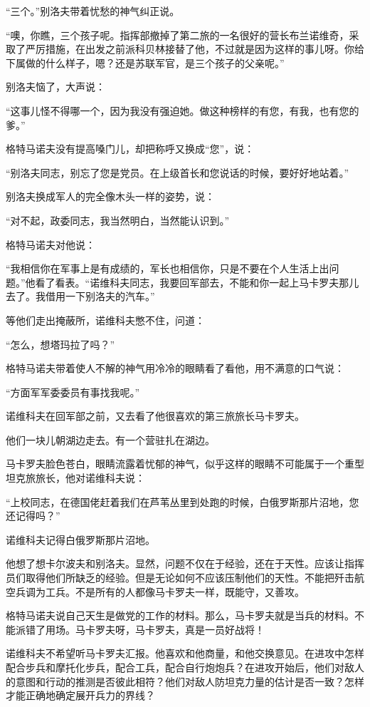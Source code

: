 “三个。”别洛夫带着忧愁的神气纠正说。

“噢，你瞧，三个孩子呢。指挥部撤掉了第二旅的一名很好的营长布兰诺维奇，采取了严厉措施，在出发之前派科贝林接替了他，不过就是因为这样的事儿呀。你给下属做的什么样子，嗯？还是苏联军官，是三个孩子的父亲呢。”

别洛夫恼了，大声说：

“这事儿怪不得哪一个，因为我没有强迫她。做这种榜样的有您，有我，也有您的爹。”

格特马诺夫没有提高嗓门儿，却把称呼又换成“您”，说：

“别洛夫同志，别忘了您是党员。在上级首长和您说话的时候，要好好地站着。”

别洛夫换成军人的完全像木头一样的姿势，说：

“对不起，政委同志，我当然明白，当然能认识到。”

格特马诺夫对他说：

“我相信你在军事上是有成绩的，军长也相信你，只是不要在个人生活上出问题。”他看了看表。“诺维科夫同志，我要回军部去，不能和你一起上马卡罗夫那儿去了。我借用一下别洛夫的汽车。”

等他们走出掩蔽所，诺维科夫憋不住，问道：

“怎么，想塔玛拉了吗？”

格特马诺夫带着使人不解的神气用冷冷的眼睛看了看他，用不满意的口气说：

“方面军军委委员有事找我呢。”

诺维科夫在回军部之前，又去看了他很喜欢的第三旅旅长马卡罗夫。

他们一块儿朝湖边走去。有一个营驻扎在湖边。

马卡罗夫脸色苍白，眼睛流露着忧郁的神气，似乎这样的眼睛不可能属于一个重型坦克旅旅长，他对诺维科夫说：

“上校同志，在德国佬赶着我们在芦苇丛里到处跑的时候，白俄罗斯那片沼地，您还记得吗？”

诺维科夫记得白俄罗斯那片沼地。

他想了想卡尔波夫和别洛夫。显然，问题不仅在于经验，还在于天性。应该让指挥员们取得他们所缺乏的经验。但是无论如何不应该压制他们的天性。不能把歼击航空兵调为工兵。不是所有的人都像马卡罗夫一样，既能守，又善攻。

格特马诺夫说自己天生是做党的工作的材料。那么，马卡罗夫就是当兵的材料。不能派错了用场。马卡罗夫呀，马卡罗夫，真是一员好战将！

诺维科夫不希望听马卡罗夫汇报。他喜欢和他商量，和他交换意见。在进攻中怎样配合步兵和摩托化步兵，配合工兵，配合自行炮炮兵？在进攻开始后，他们对敌人的意图和行动的推测是否彼此相符？他们对敌人防坦克力量的估计是否一致？怎样才能正确地确定展开兵力的界线？

